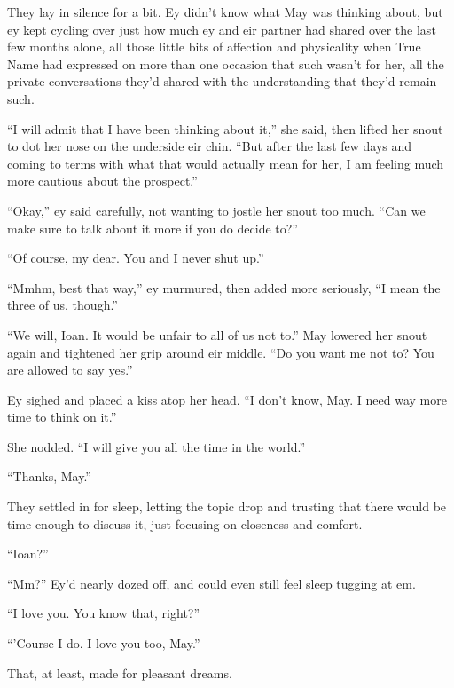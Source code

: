 They lay in silence for a bit. Ey didn't know what May was thinking about, but ey kept cycling over just how much ey and eir partner had shared over the last few months alone, all those little bits of affection and physicality when True Name had expressed on more than one occasion that such wasn't for her, all the private conversations they'd shared with the understanding that they'd remain such.

``I will admit that I have been thinking about it,'' she said, then lifted her snout to dot her nose on the underside eir chin. ``But after the last few days and coming to terms with what that would actually mean for her, I am feeling much more cautious about the prospect.''

``Okay,'' ey said carefully, not wanting to jostle her snout too much. ``Can we make sure to talk about it more if you do decide to?''

``Of course, my dear. You and I never shut up.''

``Mmhm, best that way,'' ey murmured, then added more seriously, ``I mean the three of us, though.''

``We will, Ioan. It would be unfair to all of us not to.'' May lowered her snout again and tightened her grip around eir middle. ``Do you want me not to? You are allowed to say yes.''

Ey sighed and placed a kiss atop her head. ``I don't know, May. I need way more time to think on it.''

She nodded. ``I will give you all the time in the world.''

``Thanks, May.''

They settled in for sleep, letting the topic drop and trusting that there would be time enough to discuss it, just focusing on closeness and comfort.

``Ioan?''

``Mm?'' Ey'd nearly dozed off, and could even still feel sleep tugging at em.

``I love you. You know that, right?''

``'Course I do. I love you too, May.''

That, at least, made for pleasant dreams.
